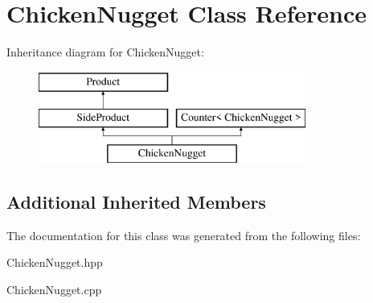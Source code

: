 \hypertarget{class_chicken_nugget}{}\section{Chicken\+Nugget Class Reference}
\label{class_chicken_nugget}
Inheritance diagram for Chicken\+Nugget\+:\begin{figure}[H]
\begin{center}
\leavevmode
\includegraphics[height=3.000000cm]{class_chicken_nugget}
\end{center}
\end{figure}
\subsection*{Additional Inherited Members}


The documentation for this class was generated from the following files\+:\begin{DoxyCompactItemize}
\item 
Chicken\+Nugget.\+hpp\item 
Chicken\+Nugget.\+cpp\end{DoxyCompactItemize}
